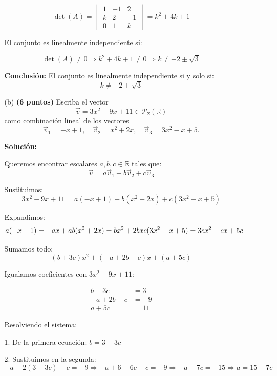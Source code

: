 \documentclass[a4paper]{article}
\begin{document}
\begin{enumerate}
\begin{enumerate}
\[
\det(A) =
\begin{vmatrix}
1 & -1 & 2 \\
k & 2 & -1 \\
0 & 1 & k
\end{vmatrix}=k^2+4k+1
\]




El conjunto es linealmente independiente si:

\[
\det(A) \ne 0 \Rightarrow k^2+4k+1 \ne 0 \Rightarrow k \ne -2\pm \sqrt{3}
\]

\vspace{1em}

\textbf{Conclusión:}  
El conjunto es linealmente independiente si y solo si:
\[
\boxed{k \ne -2\pm \sqrt{3}}
\]
    
    \vspace{1em}
    
    \item[(b)] \textbf{(6 puntos)} Escriba el vector 
    \[
    \vec{v} = 3x^2 - 9x + 11 \in \mathcal{P}_2(\mathbb{R})
    \]
    como combinación lineal de los vectores 
    \[
    \vec{v}_1 = -x + 1,\quad \vec{v}_2 = x^2 + 2x,\quad \vec{v}_3 = 3x^2 - x + 5.
    \]
    
    \textbf{Solución:}
    
    Queremos encontrar escalares \(a, b, c \in \mathbb{R}\) tales que:
    \[
    \vec{v} = a\vec{v}_1 + b\vec{v}_2 + c\vec{v}_3
    \]
    
    Sustituimos:
    \[
    3x^2 - 9x + 11 = a(-x + 1) + b(x^2 + 2x) + c(3x^2 - x + 5)
    \]
    
    Expandimos:
    \[
    a(-x + 1) = -a x + a \\
    b(x^2 + 2x) = b x^2 + 2b x \\
    c(3x^2 - x + 5) = 3c x^2 - c x + 5c
    \]
    
    Sumamos todo:
    \[
    (b + 3c)x^2 + (-a + 2b - c)x + (a + 5c)
    \]
    
    Igualamos coeficientes con \(3x^2 - 9x + 11\):

    \[
    \begin{aligned}
    b + 3c &= 3 \\
    -a + 2b - c &= -9 \\
    a + 5c &= 11
    \end{aligned}
    \]

    Resolviendo el sistema:

    1. De la primera ecuación: \(b = 3 - 3c\)

    2. Sustituimos en la segunda:
    \[
    -a + 2(3 - 3c) - c = -9 \Rightarrow -a + 6 - 6c - c = -9 \Rightarrow -a - 7c = -15 \Rightarrow a = 15 - 7c
    \]


\end{enumerate}
\end{enumerate}
\end{document}
